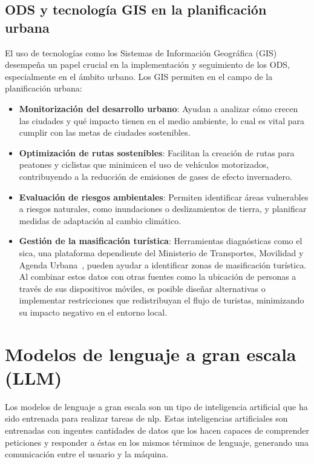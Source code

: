 	\subsection{ODS y tecnología GIS en la planificación urbana}
	El uso de tecnologías como los Sistemas de Información Geográfica (GIS) desempeña un papel crucial en la implementación y seguimiento de los ODS, especialmente en el ámbito urbano. Los GIS permiten en el campo de la planificación urbana:
	\begin{itemize}
		\item \textbf{Monitorización del desarrollo urbano}: Ayudan a analizar cómo crecen las ciudades y qué impacto tienen en el medio ambiente, lo cual es vital para cumplir con las metas de ciudades sostenibles.
		
		\item \textbf{Optimización de rutas sostenibles}: Facilitan la creación de rutas para peatones y ciclistas que minimicen el uso de vehículos motorizados, contribuyendo a la reducción de emisiones de gases de efecto invernadero.
		
		\item \textbf{Evaluación de riesgos ambientales}: Permiten identificar áreas vulnerables a riesgos naturales, como inundaciones o deslizamientos de tierra, y planificar medidas de adaptación al cambio climático.
		
		\item \textbf{Gestión de la masificación turística}: Herramientas diagnósticas como el \acrfull{sica}, una plataforma dependiente del Ministerio de Transportes, Movilidad y Agenda Urbana~\cite{sica_mapa_ruido}, pueden ayudar a identificar zonas de masificación turística. Al combinar estos datos con otras fuentes como la ubicación de personas a través de sus dispositivos móviles, es posible diseñar alternativas o implementar restricciones que redistribuyan el flujo de turistas, minimizando su impacto negativo en el entorno local.
 
		
	\end{itemize}
	

\section{Modelos de lenguaje a gran escala (LLM)}
Los modelos de lenguaje a gran escala son un tipo de inteligencia artificial que ha sido entrenada para realizar tareas de \acrfull{nlp}. Estas inteligencias artificiales son entrenadas con ingentes cantidades de datos que los hacen capaces de comprender peticiones y responder a éstas en los mismos términos de lenguaje, generando una comunicación entre el usuario y la máquina.
	
